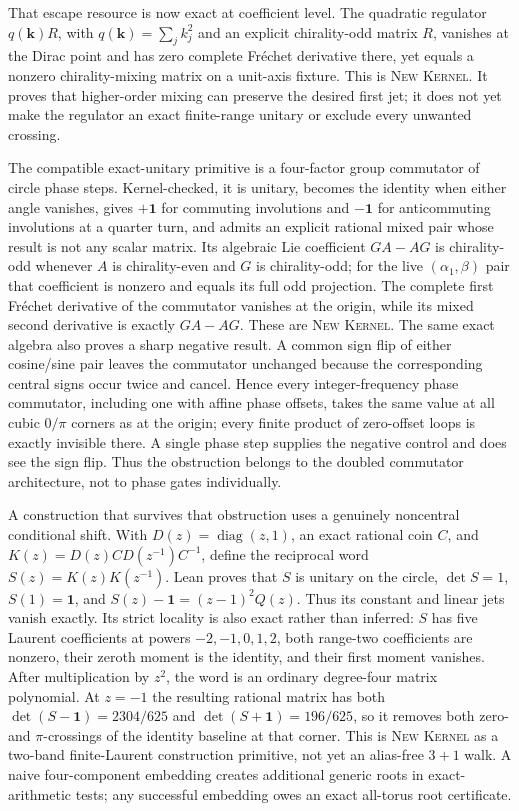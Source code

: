\documentclass[11pt]{article}
\newcommand{\Kernel}{\textcolor{kernelcolor}{\textsc{Kernel}}}
\newcommand{\NewResult}{\textsc{New}}
\newcommand{\id}{\mathbf{1}}
\begin{document}
That escape resource is now exact at coefficient level.  The quadratic
regulator $q(\mathbf k)R$, with $q(\mathbf k)=\sum_j k_j^2$ and an explicit
chirality-odd matrix $R$, vanishes at the Dirac point and has zero complete
Fr\'echet derivative there, yet equals a nonzero chirality-mixing matrix on a
unit-axis fixture.  This is \NewResult{} \Kernel{}.  It proves that higher-order
mixing can preserve the desired first jet; it does not yet make the regulator
an exact finite-range unitary or exclude every unwanted crossing.

The compatible exact-unitary primitive is a four-factor group commutator of
circle phase steps.  Kernel-checked, it is unitary, becomes the identity when
either angle vanishes, gives $+\id$ for commuting involutions and $-\id$ for
anticommuting involutions at a quarter turn, and admits an explicit rational
mixed pair whose result is not any scalar matrix.  Its algebraic Lie
coefficient $GA-AG$ is chirality-odd whenever $A$ is chirality-even and $G$ is
chirality-odd; for the live $(\alpha_1,\beta)$ pair that coefficient is
nonzero and equals its full odd projection.  The complete first Fr\'echet
derivative of the commutator vanishes at the origin, while its mixed second
derivative is exactly $GA-AG$.  These are \NewResult{} \Kernel{}.  The same
exact algebra also proves a sharp negative result.  A common sign flip of either
cosine/sine pair leaves the commutator unchanged because the corresponding
central signs occur twice and cancel.  Hence every integer-frequency phase
commutator, including one with affine phase offsets, takes the same value at
all cubic $0/\pi$ corners as at the origin; every finite product of zero-offset
loops is exactly invisible there.  A single phase step supplies the negative
control and does see the sign flip.  Thus the obstruction belongs to the
doubled commutator architecture, not to phase gates individually.

A construction that survives that obstruction uses a genuinely
noncentral conditional shift.  With
$D(z)=\operatorname{diag}(z,1)$, an exact rational coin $C$, and
$K(z)=D(z)CD(z^{-1})C^{-1}$, define the reciprocal word
$S(z)=K(z)K(z^{-1})$.  Lean proves that $S$ is unitary on the circle,
$\det S=1$, $S(1)=\id$, and
$S(z)-\id=(z-1)^2Q(z)$.  Thus its constant and linear jets vanish exactly.
Its strict locality is also exact rather than inferred: $S$ has five Laurent
coefficients at powers $-2,-1,0,1,2$, both range-two coefficients are nonzero,
their zeroth moment is the identity, and their first moment vanishes.  After
multiplication by $z^2$, the word is an ordinary degree-four matrix polynomial.
At $z=-1$ the resulting rational matrix has both
$\det(S-\id)=2304/625$ and $\det(S+\id)=196/625$, so it removes both
zero- and $\pi$-crossings of the identity baseline at that corner.  This is
\NewResult{} \Kernel{} as a two-band finite-Laurent construction primitive,
not yet an alias-free $3+1$ walk.  A naive four-component embedding creates
additional generic roots in exact-arithmetic tests; any successful embedding
owes an exact all-torus root certificate.
\end{document}
